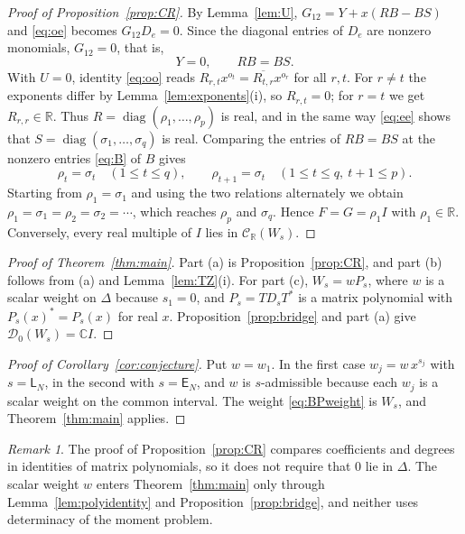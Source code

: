 \documentclass[11pt]{amsart}
\theoremstyle{definition}
\theoremstyle{remark}
\newtheorem{remark}[theorem]{Remark}
\numberwithin{equation}{section}
\newcommand{\C}{\mathbb{C}}
\newcommand{\R}{\mathbb{R}}
\newcommand{\diag}{\operatorname{diag}}
\newcommand{\cD}{\mathcal{D}}
\newcommand{\CR}{\mathcal{C}_{\R}}
\newcommand{\sL}{\mathsf{L}}
\newcommand{\sE}{\mathsf{E}}
\newcommand{\conj}[1]{\overline{#1}}
\begin{document}
\begin{proof}[Proof of Proposition~\ref{prop:CR}]
By Lemma~\ref{lem:U}, $G_{12}=Y+x(RB-BS)$ and \eqref{eq:oe} becomes
$G_{12}D_e=0$. Since the diagonal entries of $D_e$ are nonzero monomials,
$G_{12}=0$, that is,
\begin{equation}\label{eq:RBBS}
Y=0,\qquad RB=BS.
\end{equation}
With $U=0$, identity \eqref{eq:oo} reads $R_{r,t}x^{o_t}=\conj{R_{t,r}}x^{o_r}$
for all $r,t$. For $r\ne t$ the exponents differ by
Lemma~\ref{lem:exponents}(i), so $R_{r,t}=0$; for $r=t$ we get
$R_{r,r}\in\R$. Thus $R=\diag(\rho_1,\dots,\rho_p)$ is real, and in the same
way \eqref{eq:ee} shows that $S=\diag(\sigma_1,\dots,\sigma_q)$ is real.
Comparing the entries of $RB=BS$ at the nonzero entries \eqref{eq:B} of
$B$ gives
\[
\rho_t=\sigma_t\quad(1\le t\le q),\qquad
\rho_{t+1}=\sigma_t\quad(1\le t\le q,\ t+1\le p).
\]
Starting from $\rho_1=\sigma_1$ and using the two relations alternately we
obtain $\rho_1=\sigma_1=\rho_2=\sigma_2=\cdots$, which reaches $\rho_p$ and
$\sigma_q$. Hence $F=G=\rho_1I$ with $\rho_1\in\R$. Conversely, every real
multiple of $I$ lies in $\CR(W_s)$.
\end{proof}

\begin{proof}[Proof of Theorem~\ref{thm:main}]
Part (a) is Proposition~\ref{prop:CR}, and part (b) follows from (a) and
Lemma~\ref{lem:TZ}(i). For part (c), $W_s=wP_s$, where $w$ is a scalar weight
on $\Delta$ because $s_1=0$, and $P_s=TD_sT^*$ is a matrix polynomial with
$P_s(x)^*=P_s(x)$ for real $x$. Proposition~\ref{prop:bridge} and part (a)
give $\cD_0(W_s)=\C I$.
\end{proof}

\begin{proof}[Proof of Corollary~\ref{cor:conjecture}]
Put $w=w_1$. In the first case $w_j=w\,x^{s_j}$ with $s=\sL_N$, in the
second with $s=\sE_N$, and $w$ is $s$-admissible because each $w_j$ is a
scalar weight on the common interval. The weight \eqref{eq:BPweight} is
$W_s$, and Theorem~\ref{thm:main} applies.
\end{proof}

\begin{remark}
The proof of Proposition~\ref{prop:CR} compares coefficients and degrees in
identities of matrix polynomials, so it does not require that $0$ lie in
$\Delta$. The scalar weight $w$ enters Theorem~\ref{thm:main} only through
Lemma~\ref{lem:polyidentity} and Proposition~\ref{prop:bridge}, and neither
uses determinacy of the moment problem.
\end{remark}
\end{document}
